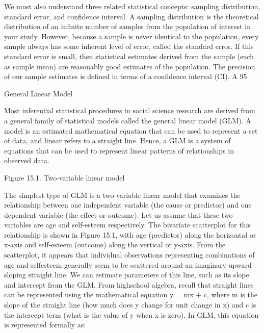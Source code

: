 We must also understand three related statistical concepts: sampling distribution, standard error, and confidence interval. A sampling distribution is the theoretical distribution of an infinite number of samples from the population of interest in your study. However, because a sample is never identical to the population, every sample always has some inherent level of error, called the standard error. If this standard error is small, then statistical estimates derived from the sample (such as sample mean) are reasonably good estimates of the population. The precision of our sample estimates is defined in terms of a confidence interval (CI). A 95%

General Linear Model

Most inferential statistical procedures in social science research are derived from a general family of statistical models called the general linear model (GLM). A model is an estimated mathematical equation that can be used to represent a set of data, and linear refers to a straight line. Hence, a GLM is a system of equations that can be used to represent linear patterns of relationships in observed data.

Figure 15.1. Two-variable linear model

The simplest type of GLM is a two-variable linear model that examines the relationship between one independent variable (the cause or predictor) and one dependent variable (the effect or outcome). Let us assume that these two variables are age and self-esteem respectively. The bivariate scatterplot for this relationship is shown in Figure 15.1, with age (predictor) along the horizontal or x-axis and self-esteem (outcome) along the vertical or y-axis. From the scatterplot, it appears that individual observations representing combinations of age and selfesteem generally seem to be scattered around an imaginary upward sloping straight line. We can estimate parameters of this line, such as its slope and intercept from the GLM. From highschool algebra, recall that straight lines can be represented using the mathematical equation y = mx + c, where m is the slope of the straight line (how much does y change for unit change in x) and c is the intercept term (what is the value of y when x is zero). In GLM, this equation is represented formally as:

